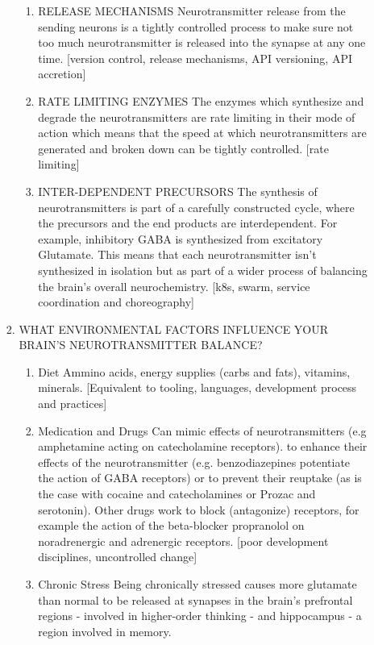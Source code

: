 \documentclass[11pt]{article}
\begin{document}
\begin{enumerate}
\begin{enumerate}
\begin{enumerate}
\begin{enumerate}
\item RELEASE MECHANISMS
\label{sec:org957369e}
Neurotransmitter release from the sending neurons is a tightly controlled process to make sure not too much neurotransmitter is released into the synapse at any one time. [version control, release mechanisms, API versioning, API accretion]

\item RATE LIMITING ENZYMES
\label{sec:org6252764}
The enzymes which synthesize and degrade the neurotransmitters are rate limiting in their mode of action which means that the speed at which neurotransmitters are generated and broken down can be tightly controlled. [rate limiting]

\item INTER-DEPENDENT PRECURSORS
\label{sec:org4a37621}
The synthesis of neurotransmitters is part of a carefully constructed cycle, where the precursors and the end products are interdependent. For example, inhibitory GABA is synthesized from excitatory Glutamate. This means that each
neurotransmitter isn’t synthesized in isolation but as part of a wider process of balancing the brain's overall neurochemistry. [k8s, swarm, service coordination and choreography]
\end{enumerate}

\item WHAT ENVIRONMENTAL FACTORS INFLUENCE YOUR BRAIN’S NEUROTRANSMITTER BALANCE?
\label{sec:orgb16d2b8}

\begin{enumerate}
\item Diet
\label{sec:org0a36b31}
Ammino acids, energy supplies (carbs and fats), vitamins, minerals. [Equivalent to tooling, languages, development process and practices]

\item Medication and Drugs
\label{sec:org051d653}
Can mimic effects of neurotransmitters (e.g amphetamine acting on catecholamine receptors). to enhance their effects of the neurotransmitter (e.g. benzodiazepines potentiate the action of GABA receptors) or to prevent their
reuptake (as is the case with cocaine and catecholamines or Prozac and serotonin). Other drugs work to block (antagonize) receptors, for example the action of the beta-blocker propranolol on noradrenergic and adrenergic receptors.
[poor development disciplines, uncontrolled change]

\item Chronic Stress
\label{sec:orgc0ad4e3}
Being chronically stressed causes more glutamate than normal to be released at synapses in the brain’s prefrontal regions - involved in higher-order thinking - and hippocampus - a region involved in memory.
\end{enumerate}


\end{enumerate}
\end{enumerate}
\end{enumerate}
\end{document}

